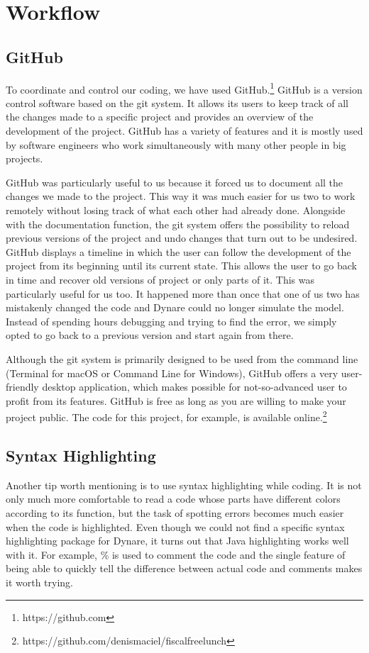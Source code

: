\section{Workflow}

\subsection*{GitHub}
\label{sub:GitHub}

To coordinate and control our coding, we have used GitHub.\footnote{https://github.com} GitHub is a version control software based on the git system. It allows its users to keep track of all the changes made to a specific project and provides an overview of the development of the project. GitHub has a variety of features and it is mostly used by software engineers who work simultaneously with many other people in big projects.
\par
\bigskip
GitHub was particularly useful to us because it forced us to document all the changes we made to the project. This way it was much easier for us two to work remotely without losing track of what each other had already done. Alongside with the documentation function, the git system offers the possibility to reload previous versions of the project and undo changes that turn out to be undesired. GitHub displays a timeline in which the user can follow the development of the project from its beginning until its current state. This allows the user to go back in time and recover old versions of project or only parts of it. This was particularly useful for us too. It happened more than once that one of us two has mistakenly changed the code and Dynare could no longer simulate the model. Instead of spending hours debugging and trying to find the error, we simply opted to go back to a previous version and start again from there.
\par
\bigskip
Although the git system is primarily designed to be used from the command line (Terminal for macOS or Command Line for Windows), GitHub offers a very user-friendly desktop application, which makes possible for not-so-advanced user to profit from its features. GitHub is free as long as you are willing to make your project public. The code for this project, for example, is available online.\footnote{https://github.com/denismaciel/fiscalfreelunch}


\subsection*{Syntax Highlighting}
\label{sub:Syntax Highlighting}

Another tip worth mentioning is to use syntax highlighting while coding. It is not only much more comfortable to read a code whose parts have different colors according to its function, but the task of spotting errors becomes much easier when the code is highlighted. Even though we could not find a specific syntax highlighting package for Dynare, it turns out that Java highlighting works well with it. For example, \% is used to comment the code and the single feature of being able to quickly tell the difference between actual code and comments makes it worth trying.
